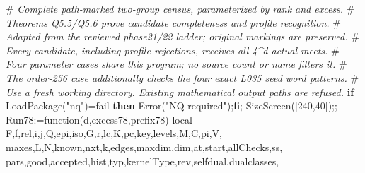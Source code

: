 \documentclass[
  10pt,
  letterpaper,
]{article}
\newenvironment{Shaded}{}{}
\newcommand{\BuiltInTok}[1]{\textcolor[rgb]{0.00,0.50,0.00}{#1}}
\newcommand{\CommentTok}[1]{\textcolor[rgb]{0.38,0.63,0.69}{\textit{#1}}}
\newcommand{\ConstantTok}[1]{\textcolor[rgb]{0.53,0.00,0.00}{#1}}
\newcommand{\ControlFlowTok}[1]{\textcolor[rgb]{0.00,0.44,0.13}{\textbf{#1}}}
\newcommand{\ExtensionTok}[1]{#1}
\newcommand{\FloatTok}[1]{\textcolor[rgb]{0.25,0.63,0.44}{#1}}
\newcommand{\FunctionTok}[1]{\textcolor[rgb]{0.02,0.16,0.49}{#1}}
\newcommand{\NormalTok}[1]{#1}
\newcommand{\OperatorTok}[1]{\textcolor[rgb]{0.40,0.40,0.40}{#1}}
\newcommand{\StringTok}[1]{\textcolor[rgb]{0.25,0.44,0.63}{#1}}
\newcommand{\VariableTok}[1]{\textcolor[rgb]{0.10,0.09,0.49}{#1}}
\begin{document}
\begin{Shaded}
\begin{Highlighting}[]
\NormalTok{\#}\CommentTok{ Complete path{-}marked two{-}group census, parameterized by rank and excess.}
\NormalTok{\#}\CommentTok{ Theorems Q5.5/Q5.6 prove candidate completeness and profile recognition.}
\NormalTok{\#}\CommentTok{ Adapted from the reviewed phase21/22 ladder; original markings are preserved.}
\NormalTok{\#}\CommentTok{ Every candidate, including profile rejections, receives all 4\^{}d actual meets.}
\NormalTok{\#}\CommentTok{ Four parameter cases share this program; no source count or name filters it.}
\NormalTok{\#}\CommentTok{ The order{-}256 case additionally checks the four exact L035 seed word patterns.}
\NormalTok{\#}\CommentTok{ Use a fresh working directory. Existing mathematical output paths are refused.}
\ControlFlowTok{if} \BuiltInTok{LoadPackage}\NormalTok{(}\StringTok{"nq"}\NormalTok{)}\OperatorTok{=}\ConstantTok{fail} \ControlFlowTok{then} \BuiltInTok{Error}\NormalTok{(}\StringTok{"NQ required"}\NormalTok{)}\OperatorTok{;}\ControlFlowTok{fi}\OperatorTok{;}
\BuiltInTok{SizeScreen}\NormalTok{([}\FloatTok{240}\OperatorTok{,}\FloatTok{40}\NormalTok{])}\OperatorTok{;;}
\VariableTok{Run78}\OperatorTok{:=}\FunctionTok{function}\NormalTok{(}\VariableTok{d}\OperatorTok{,}\VariableTok{excess78}\OperatorTok{,}\VariableTok{prefix78}\NormalTok{)}
 \ExtensionTok{local} \VariableTok{F}\OperatorTok{,}\VariableTok{f}\OperatorTok{,}\VariableTok{rel}\OperatorTok{,}\VariableTok{i}\OperatorTok{,}\VariableTok{j}\OperatorTok{,}\VariableTok{Q}\OperatorTok{,}\VariableTok{epi}\OperatorTok{,}\VariableTok{iso}\OperatorTok{,}\VariableTok{G}\OperatorTok{,}\VariableTok{r}\OperatorTok{,}\VariableTok{lc}\OperatorTok{,}\VariableTok{K}\OperatorTok{,}\VariableTok{pc}\OperatorTok{,}\VariableTok{key}\OperatorTok{,}\VariableTok{levels}\OperatorTok{,}\VariableTok{M}\OperatorTok{,}\VariableTok{C}\OperatorTok{,}\VariableTok{pi}\OperatorTok{,}\VariableTok{V}\OperatorTok{,}
  \VariableTok{maxes}\OperatorTok{,}\VariableTok{L}\OperatorTok{,}\VariableTok{N}\OperatorTok{,}\VariableTok{known}\OperatorTok{,}\VariableTok{nxt}\OperatorTok{,}\VariableTok{k}\OperatorTok{,}\VariableTok{edges}\OperatorTok{,}\VariableTok{maxdim}\OperatorTok{,}\VariableTok{dim}\OperatorTok{,}\VariableTok{at}\OperatorTok{,}\VariableTok{start}\OperatorTok{,}\VariableTok{allChecks}\OperatorTok{,}\VariableTok{ss}\OperatorTok{,}
  \VariableTok{pars}\OperatorTok{,}\VariableTok{good}\OperatorTok{,}\VariableTok{accepted}\OperatorTok{,}\VariableTok{hist}\OperatorTok{,}\VariableTok{typ}\OperatorTok{,}\VariableTok{kernelType}\OperatorTok{,}\VariableTok{rev}\OperatorTok{,}\VariableTok{selfdual}\OperatorTok{,}\VariableTok{dualclasses}\OperatorTok{,}

\end{Highlighting}
\end{Shaded}
\end{document}
